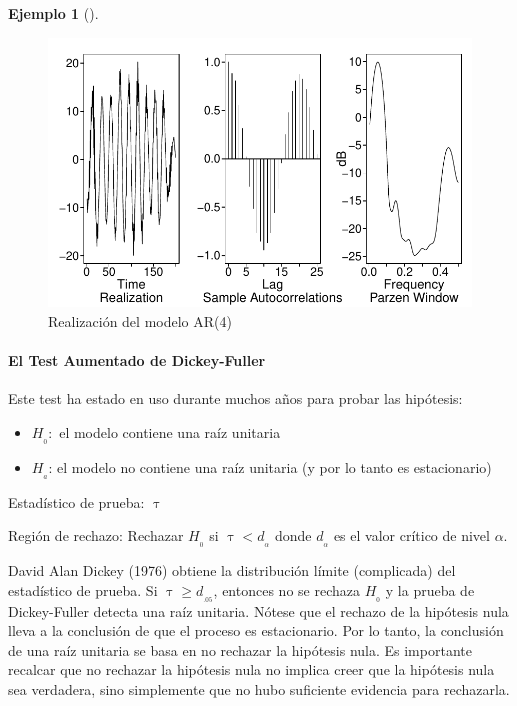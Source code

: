 \documentclass[
  us-letterpaper,
]{scrreprt}
\let\oldparagraph\paragraph
\renewcommand{\paragraph}[1]{\oldparagraph{#1}\mbox{}}
\theoremstyle{definition}
\newtheorem{example}{Ejemplo}[chapter]
\theoremstyle{plain}
\theoremstyle{plain}
\theoremstyle{definition}
\theoremstyle{remark}
\begin{document}
\begin{example}[]
\begin{tcolorbox}
\begin{figure}[H]
{\includegraphics{series_files/figure-pdf/fig-ejar4-1.pdf}

}

\caption{\label{fig-ejar4}Realización del modelo AR(4)}

\end{figure}%

\end{tcolorbox}

\end{example}

\paragraph{El Test Aumentado de
Dickey-Fuller}\label{el-test-aumentado-de-dickey-fuller}

Este test ha estado en uso durante muchos años para probar las
hipótesis:

\begin{itemize}
\item
  \(H_{_0}:\) el modelo contiene una raíz unitaria
\item
  \(H_{_a}\): el modelo no contiene una raíz unitaria (y por lo tanto es
  estacionario)
\end{itemize}

Estadístico de prueba: \(\uptau\)

Región de rechazo: Rechazar \(H_{_0}\) si \(\uptau < d_{_\alpha}\) donde
\(d_{_\alpha}\) es el valor crítico de nivel \(\alpha\).

David Alan Dickey (1976) obtiene la distribución límite (complicada) del
estadístico de prueba. Si \(\uptau \geq d_{_{.05}}\), entonces no se
rechaza \(H_{_0}\) y la prueba de Dickey-Fuller detecta una raíz
unitaria. Nótese que el rechazo de la hipótesis nula lleva a la
conclusión de que el proceso es estacionario. Por lo tanto, la
conclusión de una raíz unitaria se basa en no rechazar la hipótesis
nula. Es importante recalcar que no rechazar la hipótesis nula no
implica creer que la hipótesis nula sea verdadera, sino simplemente que
no hubo suficiente evidencia para rechazarla.
\end{document}
